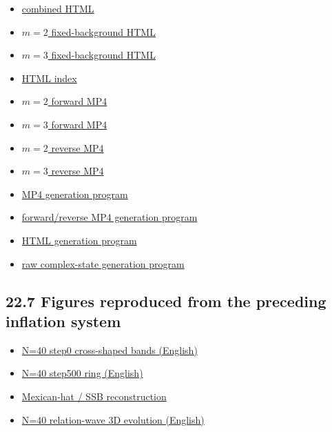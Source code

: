 \documentclass[
  a4paper,
]{article}
\providecommand{\tightlist}{%
  \setlength{\itemsep}{0pt}\setlength{\parskip}{0pt}}
\begin{document}
\begin{itemize}
\tightlist
\item
  \href{K4_harmonic_discrete_phase_animation_20260915.html}{combined
  HTML}
\item
  \href{K4_network_wave_discrete_m2.html}{\(m=2\) fixed-background HTML}
\item
  \href{K4_network_wave_discrete_m3.html}{\(m=3\) fixed-background HTML}
\item
  \href{K4_network_wave_index.html}{HTML index}
\item
  \href{K4_harmonic_discrete_phase_m2_20260915.mp4}{\(m=2\) forward MP4}
\item
  \href{K4_harmonic_discrete_phase_m3_20260915.mp4}{\(m=3\) forward MP4}
\item
  \href{K4_harmonic_discrete_phase_m2_reverse_20260915.mp4}{\(m=2\)
  reverse MP4}
\item
  \href{K4_harmonic_discrete_phase_m3_reverse_20260915.mp4}{\(m=3\)
  reverse MP4}
\item
  \href{generate_K4_harmonic_discrete_phase_mp4_20260915.py}{MP4
  generation program}
\item
  \href{generate_K4_harmonic_discrete_phase_forward_reverse_mp4_20260915.py}{forward/reverse
  MP4 generation program}
\item
  \href{generate_k4_phase_html.py}{HTML generation program}
\item
  \href{generate_K4_harmonic_complex_raw_states_20260915.py}{raw
  complex-state generation program}
\end{itemize}

\subsection{22.7 Figures reproduced from the preceding inflation
system}\label{figures-reproduced-from-the-preceding-inflation-system}

\begin{itemize}
\tightlist
\item
  \href{figs/inflation_N40_phase_step0_cross_en_20260915.png}{N=40 step0
  cross-shaped bands (English)}
\item
  \href{figs/inflation_N40_phase_step500_ring_en_20260915.png}{N=40
  step500 ring (English)}
\item
  \href{figs/inflation_mexican_hat_SSB_reconstruction_20260915.png}{Mexican-hat
  / SSB reconstruction}
\item
  \href{figs/inflation_N40_relation_wave_3D_step500_en_20260915.png}{N=40
  relation-wave 3D evolution (English)}
\end{itemize}
\end{document}

